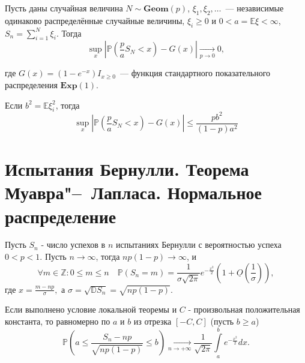 \begin{namedthm}
Пусть даны случайная величина $N \sim \mathbf{Geom}(p)$, $\xi_1, \xi_2, \ldots$~--- независимые одинаково распределённые случайные величины, $\xi_i \geqslant 0$ и $0 < a = \mathbb{E}\xi < \infty$, $S_n = \sum\limits_{i=1}^N \xi_i$. Тогда
\begin{equation*}
    \sup\limits_{x}\left|\mathbb{P}\left(\frac{p}{a} S_{N}<x\right)-G(x)\right| \underset{p \rightarrow 0}{\longrightarrow} 0,
\end{equation*}

где $G(x)=\left(1-e^{-x}\right) I_{x \geqslant 0}$~--- функция стандартного показательного распределения $\mathbf{Exp}(1)$.

Если $b^2 = \mathbb{E}\xi_i^2$, тогда
\begin{equation*}
    \sup\limits_{x}\left|\mathbb{P}\left(\frac{p}{a} S_{N}<x\right)-G(x)\right| \leqslant \frac{p b^{2}}{(1-p) a^{2}}
\end{equation*}
\end{namedthm}

\section{Испытания Бернулли. Теорема Муавра"--~Лапласа. Нормальное распределение}

\begin{namedthm} 
    Пусть $S_n$ - число успехов в $n$ испытаниях Бернулли с вероятностью успеха $0 < p < 1$. Пусть $n \to \infty$, тогда $n p(1-p) {\longrightarrow} \infty$, и 
$$\forall m \in \mathbb{Z}: 0 \leqslant m \leqslant n \quad \mathbb{P}\left(S_{n}=m\right)=\frac{1}{\sigma \sqrt{2 \pi} } e^{-\frac{x^{2}}{2}}\left(1+\underline{O}\left(\frac{1}{\sigma}\right)\right),$$
где $x = \frac{m - np}{\sigma},$ а $\sigma=\sqrt{\mathbb{D} S_{n}}=\sqrt{n p(1-p)}$.
\end{namedthm}  

\begin{namedthm}
Если выполнено условие локальной теоремы и $C$ - произвольная положительная константа, то равномерно по $a$ и $b$ из отрезка $[-C,C]$ (пусть $b \geqslant a$)
$$\mathbb{P}\left(a \leqslant \frac{S_{n}-n p}{\sqrt{n p(1-p)}} \leqslant b\right) \underset{n \to +\infty}{\longrightarrow} \frac{1}{\sqrt{2 \pi}} \int\limits_{a}^{b} e^{-\frac{x^{2}}{2}} d x.$$
\end{namedthm} 

